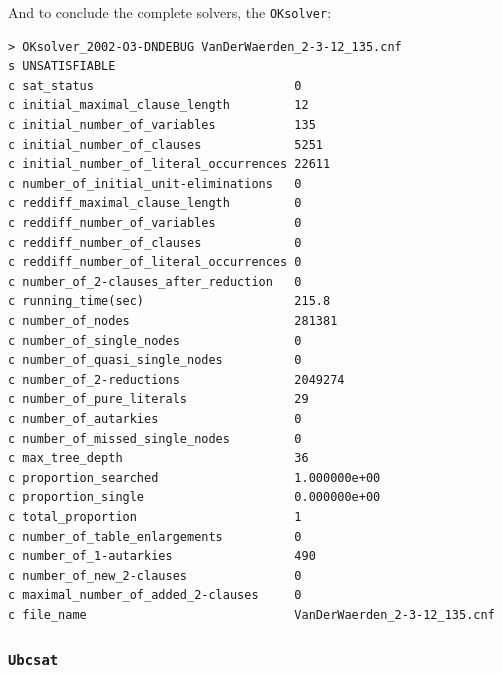 \documentclass[final,3p,times]{elsarticle}
\theoremstyle{definition}
\newcommand{\oksolver}{\texttt{OKsolver}}
\begin{document}
\begin{appendix}
And to conclude the complete solvers, the \oksolver:
\begin{verbatim}
> OKsolver_2002-O3-DNDEBUG VanDerWaerden_2-3-12_135.cnf
s UNSATISFIABLE
c sat_status                            0
c initial_maximal_clause_length         12
c initial_number_of_variables           135
c initial_number_of_clauses             5251
c initial_number_of_literal_occurrences 22611
c number_of_initial_unit-eliminations   0
c reddiff_maximal_clause_length         0
c reddiff_number_of_variables           0
c reddiff_number_of_clauses             0
c reddiff_number_of_literal_occurrences 0
c number_of_2-clauses_after_reduction   0
c running_time(sec)                     215.8
c number_of_nodes                       281381
c number_of_single_nodes                0
c number_of_quasi_single_nodes          0
c number_of_2-reductions                2049274
c number_of_pure_literals               29
c number_of_autarkies                   0
c number_of_missed_single_nodes         0
c max_tree_depth                        36
c proportion_searched                   1.000000e+00
c proportion_single                     0.000000e+00
c total_proportion                      1
c number_of_table_enlargements          0
c number_of_1-autarkies                 490
c number_of_new_2-clauses               0
c maximal_number_of_added_2-clauses     0
c file_name                             VanDerWaerden_2-3-12_135.cnf
\end{verbatim}


\subsubsection{\texttt{Ubcsat}}
\label{sec:OKlubc}


\end{appendix}
\end{document}
